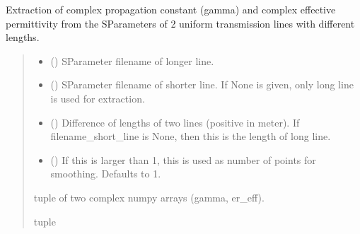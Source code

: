 \documentclass[letterpaper,10pt,english]{sphinxmanual}
\begin{document}
\begin{fulllineitems}
\label{\detokenize{touchstone:touchstone.extract_gamma_ereff}}
\pysigstartsignatures
{}
\pysigstopsignatures
\sphinxAtStartPar
Extraction of complex propagation constant (gamma) and complex effective permittivity from the S\sphinxhyphen{}Parameters of 2 uniform transmission lines with different lengths.
\begin{quote}\begin{description}
\begin{itemize}
\item {}
\sphinxAtStartPar
{} () \textendash{} S\sphinxhyphen{}Parameter filename of longer line.

\item {}
\sphinxAtStartPar
{} () \textendash{} S\sphinxhyphen{}Parameter filename of shorter line. If None is given, only long line is used for extraction.

\item {}
\sphinxAtStartPar
{} () \textendash{} Difference of lengths of two lines (positive in meter). If filename\_short\_line is None, then this is the length of long line.

\item {}
\sphinxAtStartPar
{} (\sphinxstyleliteralemphasis{\sphinxupquote{, }}) \textendash{} If this is larger than 1, this is used as number of points for smoothing. Defaults to 1.

\end{itemize}

\sphinxAtStartPar
tuple of two complex numpy arrays (gamma, er\_eff).

\sphinxAtStartPar
tuple

\end{description}\end{quote}

\end{fulllineitems}
\end{document}
